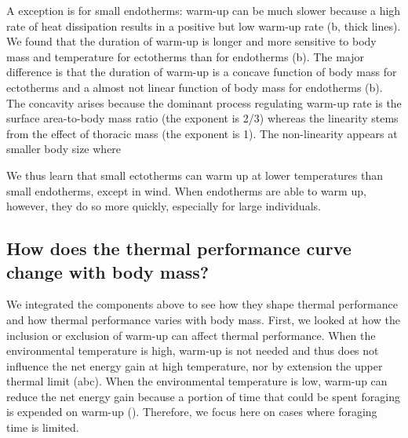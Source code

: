 A exception is for small endotherms: warm-up can be much slower because a high rate of heat dissipation results in a positive but low warm-up rate (b, thick lines).
We found that the duration of warm-up is longer and more sensitive to body mass and temperature for ectotherms than for endotherms (b). %
The major difference is that the duration of warm-up is a concave function of body mass for ectotherms and a almost not linear function of body mass for endotherms (b).
The concavity arises because the dominant process regulating warm-up rate is the surface area-to-body mass ratio (the exponent is 2/3) whereas the linearity stems from the effect of thoracic mass (the exponent is 1).
The non-linearity appears at smaller body size where



We thus learn that small ectotherms can warm up at lower temperatures than small endotherms, except in wind.
When endotherms are able to warm up, however, they do so more quickly, especially for large individuals.


\subsection*{How does the thermal performance curve change with body mass?}

We integrated the components above to see how they shape thermal performance and how thermal performance varies with body mass.
First, we looked at how the inclusion or exclusion of warm-up can affect thermal performance.
When the environmental temperature is high, warm-up is not needed and thus does not influence the net energy gain at high temperature, nor by extension the upper thermal limit (abc).
When the environmental temperature is low, warm-up can reduce the net energy gain because a portion of time that could be spent foraging is expended on warm-up ().
Therefore, we focus here on cases where foraging time is limited.


